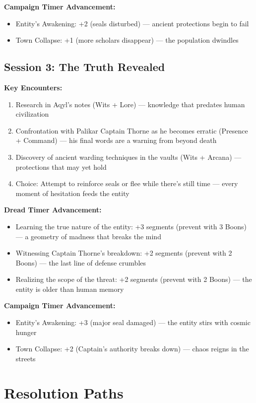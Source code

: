 \documentclass[11pt]{article}
\begin{document}
\textbf{Campaign Timer Advancement:}
\begin{itemize}
\item Entity's Awakening: +2 (seals disturbed) --- ancient protections begin to fail
\item Town Collapse: +1 (more scholars disappear) --- the population dwindles
\end{itemize}

\subsection{Session 3: The Truth Revealed}

\textbf{Key Encounters:}
\begin{enumerate}
\item Research in Aqyl's notes (Wits + Lore) --- knowledge that predates human civilization
\item Confrontation with Palikar Captain Thorne as he becomes erratic (Presence + Command) --- his final words are a warning from beyond death
\item Discovery of ancient warding techniques in the vaults (Wits + Arcana) --- protections that may yet hold
\item Choice: Attempt to reinforce seals or flee while there's still time --- every moment of hesitation feeds the entity
\end{enumerate}

\textbf{Dread Timer Advancement:}
\begin{itemize}
\item Learning the true nature of the entity: +3 segments (prevent with 3 Boons) --- a geometry of madness that breaks the mind
\item Witnessing Captain Thorne's breakdown: +2 segments (prevent with 2 Boons) --- the last line of defense crumbles
\item Realizing the scope of the threat: +2 segments (prevent with 2 Boons) --- the entity is older than human memory
\end{itemize}

\textbf{Campaign Timer Advancement:}
\begin{itemize}
\item Entity's Awakening: +3 (major seal damaged) --- the entity stirs with cosmic hunger
\item Town Collapse: +2 (Captain's authority breaks down) --- chaos reigns in the streets
\end{itemize}

\section{Resolution Paths}
\end{document}
